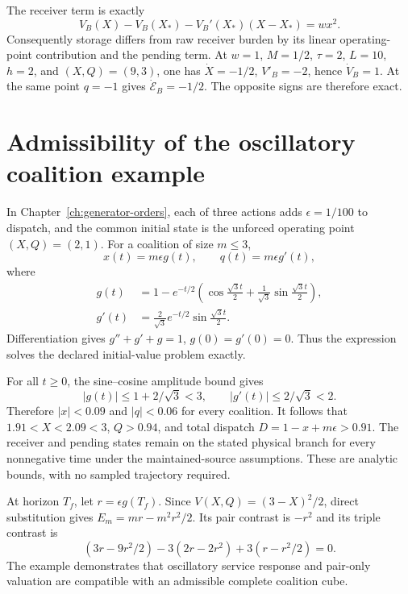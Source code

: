 The receiver term is exactly
\begin{equation}
 V_B(X)-V_B(X_*)-V_B'(X_*)(X-X_*)=wx^2.
\end{equation}
Consequently storage differs from raw receiver burden by its linear operating-point contribution and the pending term. At $w=1$, $M=1/2$, $\tau=2$, $L=10$, $h=2$, and $(X,Q)=(9,3)$, one has $\dot X=-1/2$, $V'_B=-2$, hence $\dot V_B=1$. At the same point $q=-1$ gives $\dot{\mathcal E}_B=-1/2$. The opposite signs are therefore exact.

\section{Admissibility of the oscillatory coalition example}
In Chapter~\ref{ch:generator-orders}, each of three actions adds $\epsilon=1/100$ to dispatch, and the common initial state is the unforced operating point $(X,Q)=(2,1)$. For a coalition of size $m\leq3$,
\begin{equation}
 x(t)=m\epsilon g(t),\qquad q(t)=m\epsilon g'(t),
\end{equation}
where
\begin{align}
 g(t)&=1-e^{-t/2}\left(\cos\frac{\sqrt3t}{2}
 +\frac1{\sqrt3}\sin\frac{\sqrt3t}{2}\right),\\
 g'(t)&=\frac2{\sqrt3}e^{-t/2}\sin\frac{\sqrt3t}{2}.
\end{align}
Differentiation gives $g''+g'+g=1$, $g(0)=g'(0)=0$. Thus the expression solves the declared initial-value problem exactly.

For all $t\geq0$, the sine--cosine amplitude bound gives
\begin{equation}
 |g(t)|\leq1+2/\sqrt3<3,\qquad |g'(t)|\leq2/\sqrt3<2.
\end{equation}
Therefore $|x|<0.09$ and $|q|<0.06$ for every coalition. It follows that $1.91<X<2.09<3$, $Q>0.94$, and total dispatch $D=1-x+m\epsilon>0.91$. The receiver and pending states remain on the stated physical branch for every nonnegative time under the maintained-source assumptions. These are analytic bounds, with no sampled trajectory required.

At horizon $T_f$, let $r=\epsilon g(T_f)$. Since $V(X,Q)=(3-X)^2/2$, direct substitution gives $E_m=mr-m^2r^2/2$. Its pair contrast is $-r^2$ and its triple contrast is
\begin{equation}
 (3r-9r^2/2)-3(2r-2r^2)+3(r-r^2/2)=0.
\end{equation}
The example demonstrates that oscillatory service response and pair-only valuation are compatible with an admissible complete coalition cube.

